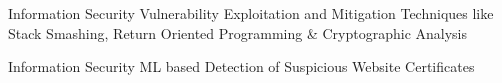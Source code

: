 \begin{cvprojects}
  \cvproject
    {Information Security} %
    {Vulnerability Exploitation and Mitigation Techniques like Stack Smashing, Return Oriented Programming \& Cryptographic Analysis} %

  \cvproject
    {Information Security} %
    {ML based Detection of Suspicious Website Certificates} %

\end{cvprojects}
